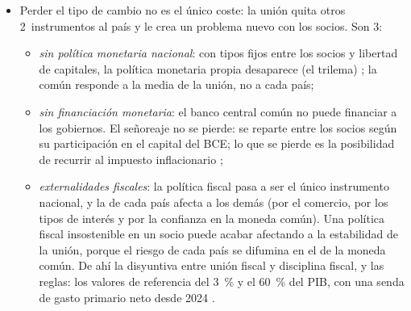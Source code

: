 \documentclass[11pt]{article}
\begin{document}
\begin{itemize}
\item Perder el tipo de cambio no es el único coste: la unión quita otros 2~instrumentos al país y le crea un problema nuevo con los socios. Son 3:
  \begin{itemize}
  \item \emph{sin política monetaria nacional}: con tipos fijos entre los socios y libertad de capitales, la política monetaria propia desaparece (el trilema) ; la común responde a la media de la unión, no a cada país;
  \item \emph{sin financiación monetaria}: el banco central común no puede financiar a los gobiernos. El señoreaje no se pierde: se reparte entre los socios según su participación en el capital del BCE; lo que se pierde es la posibilidad de recurrir al impuesto inflacionario ;
  \item \emph{externalidades fiscales}: la política fiscal pasa a ser el único instrumento nacional, y la de cada país afecta a los demás (por el comercio, por los tipos de interés y por la confianza en la moneda común). Una política fiscal insostenible en un socio puede acabar afectando a la estabilidad de la unión, porque el riesgo de cada país se difumina en el de la moneda común. De ahí la disyuntiva entre unión fiscal y disciplina fiscal, y las reglas: los valores de referencia del 3~\% y el 60~\% del PIB, con una senda de gasto primario neto desde 2024\nocite{UE2024Reglamento1263,UE2024Reglamento1264} .
  \end{itemize}
\end{itemize}
\end{document}
